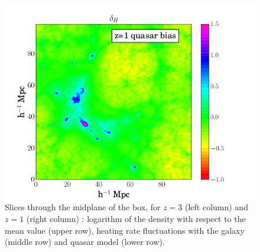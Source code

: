 \documentclass[numberedappendix]{emulateapj}
\begin{document}
\begin{figure}
\includegraphics[width = .45\textwidth ]{data_delta_z1_qso4.png}
\caption{ Slices through the midplane of the box, for $z=3$ (left column) and $z=1$ (right column) : logarithm of the density with respect to the mean value (upper row), heating rate fluctuations with the galaxy (middle row) and quasar model (lower row). }
\label{fig:slice}
\end{figure}
\end{document}
